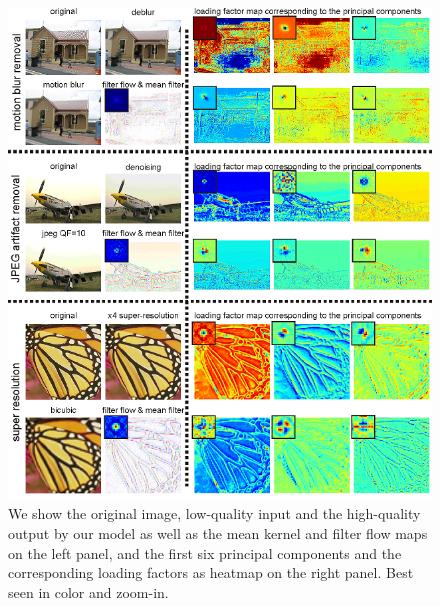 \begin{figure}[t]
    \centering
    \begin{minipage}{0.49\textwidth}
        \centering
        \includegraphics[width=1\linewidth]{demo_analysisFF_v2.png}
    \end{minipage}
    \caption{
    We show the original image,
    low-quality input and the high-quality output by our model as well as the mean kernel and filter flow maps on the left panel,
    and the first six principal components and the corresponding loading factors as heatmap
    on the right panel.
    Best seen in color and zoom-in.}
    \label{fig:demo_loadingFactorPCA}
\end{figure}


